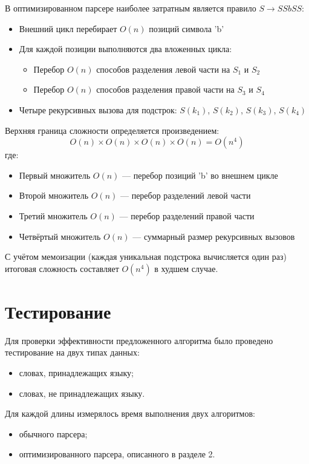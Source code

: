 \documentclass{article}
\begin{document}
В оптимизированном парсере наиболее затратным является правило $S \rightarrow S S b S S$:

\begin{itemize}
    \item Внешний цикл перебирает $O(n)$ позиций символа 'b'
    \item Для каждой позиции выполняются два вложенных цикла:
    \begin{itemize}
        \item Перебор $O(n)$ способов разделения левой части на $S_1$ и $S_2$
        \item Перебор $O(n)$ способов разделения правой части на $S_3$ и $S_4$
    \end{itemize}
    \item Четыре рекурсивных вызова для подстрок: $S(k_1)$, $S(k_2)$, $S(k_3)$, $S(k_4)$
\end{itemize}

Верхняя граница сложности определяется произведением:
\[
O(n) \times O(n) \times O(n) \times O(n) = O(n^4)
\]
где:
\begin{itemize}
    \item Первый множитель $O(n)$ — перебор позиций 'b' во внешнем цикле
    \item Второй множитель $O(n)$ — перебор разделений левой части
    \item Третий множитель $O(n)$ — перебор разделений правой части
    \item Четвёртый множитель $O(n)$ — суммарный размер рекурсивных вызовов
\end{itemize}

С учётом мемоизации (каждая уникальная подстрока вычисляется один раз) итоговая сложность составляет $O(n^4)$ в худшем случае.

\section{Тестирование}

Для проверки эффективности предложенного алгоритма было проведено тестирование на двух типах данных:
\begin{itemize}
    \item словах, принадлежащих языку;
    \item словах, не принадлежащих языку.
\end{itemize}

Для каждой длины измерялось время выполнения двух алгоритмов:
\begin{itemize}
    \item обычного парсера;
    \item оптимизированного парсера, описанного в разделе 2.
\end{itemize}
\end{document}
